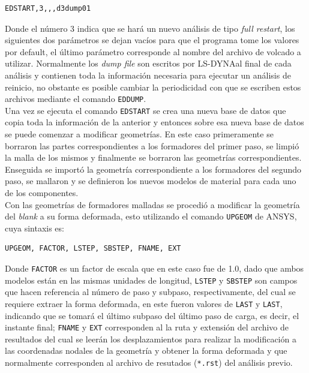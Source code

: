 \begin{verbatim}
EDSTART,3,,,d3dump01
\end{verbatim}

Donde el número 3 indica que se hará un nuevo análisis de tipo \textit{full restart}, los siguientes dos parámetros 
se dejan vacíos para que el programa tome los valores por default, el último parámetro corresponde al nombre del 
archivo de volcado a utilizar. Normalmente los \textit{dump file} son escritos por LS-DYNA\CR al final de 
cada análisis y contienen toda la información necesaria para ejecutar un análisis de reinicio, no obstante es posible 
cambiar la periodicidad con que se escriben estos archivos mediante el comando \texttt{EDDUMP}. ~\cite{ansys-command} \\

Una vez se ejecuta el comando \texttt{EDSTART} se crea una nueva base de datos que copia toda la información de 
la anterior y entonces sobre esa nueva base de datos se puede comenzar a modificar geometrías. En este caso 
primeramente se borraron las partes correspondientes a los formadores del primer paso, se limpió la malla de 
los mismos y finalmente se borraron las geometrías correspondientes. Enseguida se importó la geometría 
correspondiente a los formadores del segundo paso, se mallaron y se definieron los nuevos modelos 
de material para cada uno de los componentes.\\

Con las geometrías de formadores malladas se procedió a modificar la geometría del \textit{blank} a su 
forma deformada, esto utilizando el comando \texttt{UPGEOM} de ANSYS\CR, cuya sintaxis es:  ~\cite{ansys-command}

\begin{verbatim}
UPGEOM, FACTOR, LSTEP, SBSTEP, FNAME, EXT
\end{verbatim}

Donde \texttt{FACTOR} es un factor de escala que en este caso fue de 1.0, dado que ambos modelos están en 
las mismas unidades de longitud, \texttt{LSTEP} y \texttt{SBSTEP} son campos que hacen referencia al número 
de paso y subpaso, respectivamente, del cual se requiere extraer la forma deformada, en este fueron valores 
de \texttt{LAST} y \texttt{LAST}, indicando que se tomará el último subpaso del último paso de carga, es decir, el instante 
final; \texttt{FNAME} y \texttt{EXT} corresponden al la ruta y extensión del archivo de resultados del cual 
se leerán los desplazamientos para realizar la modificación a las coordenadas nodales de la geometría y 
obtener la forma deformada y que normalmente corresponden al archivo de resutados (\texttt{*.rst}) del análisis previo. \\

